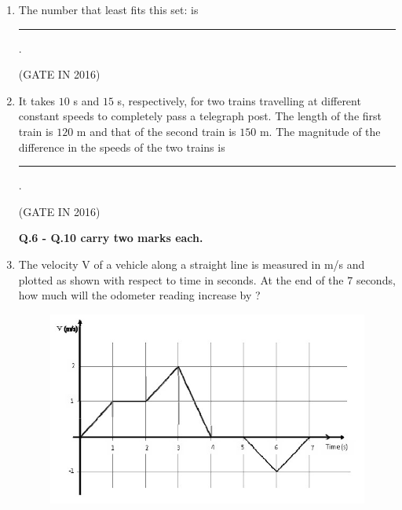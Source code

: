 \documentclass[journal,12pt,onecolumn]{IEEEtran}
\theoremstyle{remark}
\begin{document}
\begin{enumerate}
\item The number that least fits this set:  is \rule{2cm}{0.4pt}.

\hfill{(GATE IN 2016)}
\begin{enumerate}
\end{enumerate}

\item It takes $10$ s and $15$ s, respectively, for two trains travelling at different constant speeds to completely pass a telegraph post. The length of the first train is $120$ m and that of the second train is $150$ m. The magnitude of the difference in the speeds of the two trains  is \rule{2cm}{0.4pt}.

\hfill{(GATE IN 2016)}
\begin{enumerate}
\end{enumerate}

\textbf{Q.6 - Q.10 carry two marks each.}

\item The velocity V of a vehicle along a straight line is measured in m/s and plotted as shown with respect to time in seconds. At the end of the $7$ seconds, how much will the odometer reading increase by ?

\begin{figure}[H]
\centering
\includegraphics[width=0.8\columnwidth]{figs/z1.jpg}
\caption*{}
\label{fig:z1}
\end{figure}




\end{enumerate}
\end{document}
